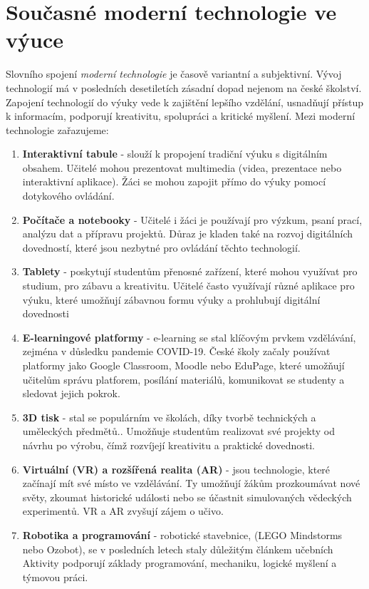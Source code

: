 \documentclass[a4paper,12pt,twoside,FP]{article}
\begin{document}
\section{Současné moderní technologie ve výuce}
Slovního spojení \textit{moderní technologie} je časově variantní a subjektivní. Vývoj technologií má v posledních desetiletích zásadní dopad nejenom na české školství. Zapojení technologií do výuky vede k zajištění lepšího vzdělání, usnadňují přístup k informacím, podporují kreativitu, spolupráci a kritické myšlení. Mezi moderní technologie zařazujeme:
\begin{enumerate}
	\item \textbf{Interaktivní tabule} - slouží k propojení tradiční výuku s digitálním obsahem. Učitelé mohou prezentovat multimedia (videa, prezentace nebo interaktivní aplikace). Žáci se mohou zapojit přímo do výuky pomocí dotykového ovládání. 
	\item \textbf{Počítače a notebooky} - Učitelé i žáci je používají pro výzkum, psaní prací, analýzu dat a přípravu projektů. Důraz je kladen také na rozvoj digitálních dovedností, které jsou nezbytné pro ovládání těchto technologií.
	\item \textbf{Tablety} - poskytují studentům přenosné zařízení, které mohou využívat pro studium, pro zábavu a kreativitu. Učitelé často využívají různé aplikace pro výuku, které umožňují zábavnou formu výuky a prohlubují digitální dovednosti
	\item \textbf{E-learningové platformy} - e-learning se stal klíčovým prvkem vzdělávání, zejména v důsledku pandemie COVID-19. České školy začaly používat platformy jako Google Classroom, Moodle nebo EduPage, které umožňují učitelům správu platforem, posílání materiálů, komunikovat se studenty a sledovat jejich pokrok.
	\item \textbf{3D tisk} - stal se populárním ve školách, díky tvorbě technických a uměleckých předmětů.. Umožňuje studentům realizovat své projekty od návrhu po výrobu, čímž rozvíjejí kreativitu a praktické dovednosti.
	\item \textbf{Virtuální (VR) a rozšířená realita (AR)} - jsou technologie, které začínají mít své místo ve vzdělávání. Ty umožňují žákům prozkoumávat nové světy, zkoumat historické události nebo se účastnit simulovaných vědeckých experimentů. VR a AR zvyšují zájem o učivo.
	\item \textbf{Robotika a programování} - robotické stavebnice, (LEGO Mindstorms nebo Ozobot), se v posledních letech staly důležitým článkem učebních Aktivity podporují základy programování, mechaniku, logické myšlení a týmovou práci.

\end{enumerate}
\end{document}
